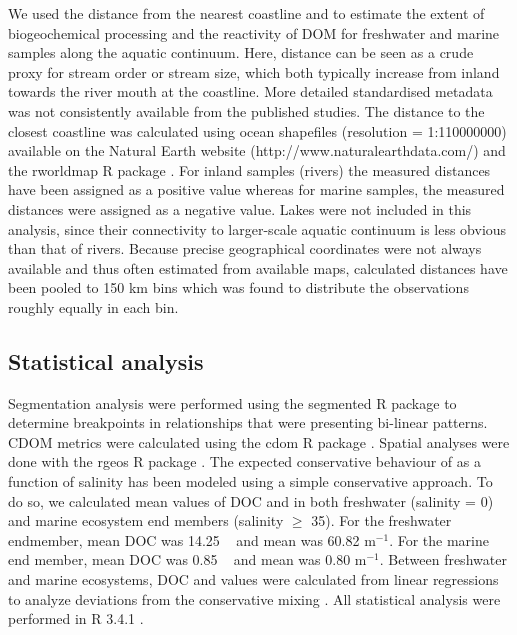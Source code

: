 We used the distance from the nearest coastline and  to estimate the extent of biogeochemical processing and the reactivity of DOM for freshwater and marine samples along the aquatic continuum. Here, distance can be seen as a crude proxy for stream order or stream size, which both typically increase from inland towards the river mouth at the coastline. More detailed standardised metadata was not consistently available from the published studies. The distance to the closest coastline was calculated using ocean shapefiles (resolution = 1:110000000) available on the Natural Earth website (http://www.naturalearthdata.com/) and the rworldmap R package \citep{South2011}. For inland samples (rivers) the measured distances have been assigned as a positive value whereas for marine samples, the measured distances were assigned as a negative value. Lakes were not included in this analysis, since their connectivity to larger-scale aquatic continuum is less obvious than that of rivers. Because precise geographical coordinates were not always available and thus often estimated from available maps, calculated distances have been pooled to 150 km bins which was found to distribute the observations roughly equally in each bin.

\subsection*{Statistical analysis}

Segmentation analysis were performed using the segmented R package \citep{Muggeo2003, Muggeo2008} to determine breakpoints in relationships that were presenting bi-linear patterns. CDOM metrics were calculated using the cdom R package \citep{Massicotte2016MC}. Spatial analyses were done with the rgeos R package \citep{Bivand2016}. The expected conservative behaviour of  as a function of salinity has been modeled using a simple conservative approach. To do so, we calculated mean values of DOC and  in both freshwater (salinity = 0) and marine ecosystem end members (salinity $\ge$ 35). For the freshwater endmember, mean DOC was 14.25 \doc~ and mean  was 60.82 m$^{-1}$. For the marine end member, mean DOC was 0.85 \doc~ and mean  was 0.80 m$^{-1}$. Between freshwater and marine ecosystems, DOC and  values were calculated from linear regressions to analyze deviations from the conservative mixing \citep{Officer1976}. All statistical analysis were performed in R 3.4.1 \citep{RCoreTeam2017}.
